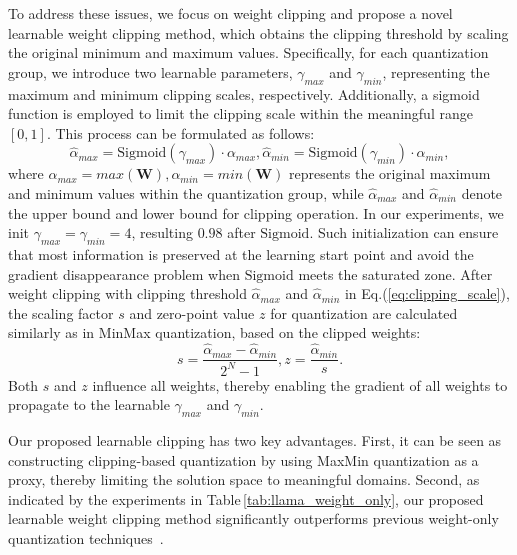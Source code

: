 \documentclass{article} %
\begin{document}
To address these issues, we focus on weight clipping and propose a novel learnable weight clipping method, which obtains the clipping threshold by scaling the original minimum and maximum values. 
%
Specifically, for each quantization group, we introduce two learnable parameters, $\gamma_{max}$ and $\gamma_{min}$, representing the maximum and minimum clipping scales, respectively. Additionally, a sigmoid function is employed to limit the clipping scale within the meaningful range $[0,1]$. This process can be formulated as follows:
\begin{equation}
    \hat{\alpha}_{max} = \mathrm{Sigmoid}(\gamma_{max}) \cdot \alpha_{max}, \hat{\alpha}_{min} = \mathrm{Sigmoid}(\gamma_{min}) \cdot \alpha_{min},\label{eq:clipping_scale}
\end{equation}
where $\alpha_{max} = max(\mathbf{W}), \alpha_{min} = min(\mathbf{W})$ represents the original maximum and minimum values within the quantization group, while $\hat{\alpha}_{max}$ and $\hat{\alpha}_{min}$ denote the upper bound and lower bound for clipping operation.
%
In our experiments, we init $\gamma_{max}=\gamma_{min}=4$, resulting $0.98$ after $\mathrm{Sigmoid}$. Such initialization can ensure that most information is preserved at the learning start point and avoid the gradient disappearance problem when $\mathrm{Sigmoid}$ meets the saturated zone.
%
After weight clipping with clipping threshold $\hat{\alpha}_{max}$ and $\hat{\alpha}_{min}$ in Eq.(\ref{eq:clipping_scale}), the scaling factor $s$ and zero-point value $z$ for quantization are calculated similarly as in MinMax quantization, based on the clipped weights:
\begin{equation}
    s = \frac{\hat{\alpha}_{max}- \hat{\alpha}_{min}}{2^N - 1}, z=\frac{\hat{\alpha}_{min}}{s}.\label{eq:clipping_sz}
\end{equation}
Both $s$ and $z$ influence all weights, thereby enabling the gradient of all weights to propagate to the learnable $\gamma_{max}$ and $\gamma_{min}$.  

Our proposed learnable clipping has two key advantages. First, it can be seen as constructing clipping-based quantization by using MaxMin quantization as a proxy, thereby limiting the solution space to meaningful domains.
%
Second, as indicated by the experiments in Table\,\ref{tab:llama_weight_only}, our proposed learnable weight clipping method significantly outperforms previous weight-only quantization techniques~\citep{gptq,awq}.
\fi
\end{document}
